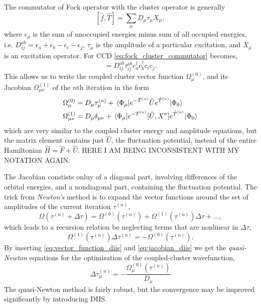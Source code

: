     The commutator of Fock operator with the cluster operator is generally
    \begin{equation}
        \label{eq:fock_cluster_commutator}
        [\hat{f}, \hat{T}] = \sum_\mu D_\mu \tau_\mu X_\mu,
    \end{equation}
    where $\epsilon_\mu$ is the sum of unoccupied energies minus sum of all 
    occupied energies, i.e. $D^{ab}_{ij} = \epsilon_a  + \epsilon_b - \epsilon_i - \epsilon_j$,
    $\tau_\mu$ is the amplitude of a particular excitation, and $X_\mu$ is an excitation 
    operator. For CCD \autoref{eq:fock_cluster_commutator} becomes,
    \begin{equation}
        [\hat{f}, \hat{T}_2] = D^{ab}_{ij} \tau^{ab}_{ij} c^\dagger_a c^\dagger_b c_i c_j.
    \end{equation}
    This allows us to write the coupled cluster vector function $\Omega^{(0)}_\mu$,
    and its Jacobian $\Omega^{(1)}_{\mu\nu}$ of the $n$th iteration in the form 
    \begin{align}
        \label{eq:vector_function_diis}
        \Omega^{(0)}_\mu &= D_\mu \tau^{(n)}_\mu 
            + \mel{\Phi_\mu}
            {e^{-\hat{T}^{(n)}} \hat{U} e^{\hat{T}^{(n)}}}
            {\Phi_0} \\
        \label{eq:jacobian_diis}
        \Omega^{(1)}_{\mu\nu} &= D_\mu\delta_{\mu\nu} 
            + \mel{\Phi_\mu}
            {e^{-\hat{T}^{(n)}} [\hat{U}, X^\nu] e^{\hat{T}^{(n)}}}
            {\Phi_0}
    \end{align}
    which are very similar to the coupled cluster energy and amplitude equations, but 
    the matrix element contains just $\hat{U}$, the fluctuation potential, instead of 
    the entire Hamiltonian $\hat{H} = \hat{F} + \hat{U}$. HERE I AM BEING INCONSISTENT
    WITH MY NOTATION AGAIN.

    The Jacobian constists onluy of a diagonal part, involving differences of the 
    orbital energies, and a nondiagonal part, containing the fluctuation potential.
    The trick from \emph{Newton's} method is to expand the vector functions around 
    the set of amplitudes of the current iteration $\tau^{(n)}$,
    \begin{equation}
        \Omega(\tau^{(n)} + \Delta\tau) = \Omega^{(0)}(\tau^{(n)})
            + \Omega^{(1)}(\tau^{(n)})\Delta \tau + \dots,
    \end{equation}
    which leads to a recursion relation be neglecting terms that are nonlinear in
    $\Delta \tau$,
    \begin{equation}
        \Omega^{(1)}(\tau^{(n)})\Delta \tau^{(n)} = - \Omega^{(0)}(\tau^{(n)}).
    \end{equation}
    By inserting \autoref{eq:vector_function_diis} and \autoref{eq:jacobian_diis} 
    we get the \emph{quasi-Newton} equations for the optimisation of the 
    coupled-cluster wavefunction,
    \begin{equation}
        \label{eq:quasi_newton}
        \Delta \tau^{(n)}_\mu = - \frac{\Omega^{(0)}_\mu(\tau^{(n)})}{D_\mu}
    \end{equation}
    The quasi-Newton method is fairly robust, but the convergence may be improved 
    significantly by introducing DIIS.

